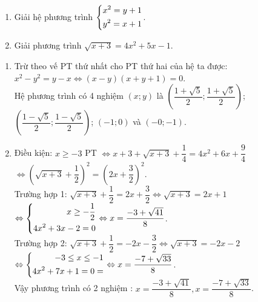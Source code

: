 \begin{ex}%
    \begin{enumerate}
        \item Giải hệ phương trình $\left\{\begin{aligned}x^2=y+1\\y^2=x+1\end{aligned}\right.$.\\
        \item Giải phương trình $\sqrt{x+3}=4x^2+5x-1$.
    \end{enumerate}
\loigiai
    {
    \begin{enumerate}
        \item Trừ theo vế PT thứ nhất cho PT thứ hai của hệ ta được:\\
 $x^2-y^2=y-x \Leftrightarrow \left( {x - y} \right)\left( {x + y + 1} \right) = 0$.\\
Hệ phương trình có 4 nghiệm $\left( {x;y} \right)$ là $\left( {\dfrac{{1 + \sqrt 5 }}{2};\dfrac{{1 + \sqrt 5 }}{2}} \right)$;\\
$\left( {\dfrac{{1 - \sqrt 5 }}{2};\dfrac{{1 - \sqrt 5 }}{2}} \right)$; $\left( {-1;0} \right)$ và $\left( {-0;-1} \right)$.
        \item Điều kiện: $x \ge -3$ PT $\Leftrightarrow x+3+\sqrt{x+3}+\dfrac{1}{4}=4x^2+6x+\dfrac{9}{4}$\\
$\Leftrightarrow {\left( {\sqrt {x + 3}  + \dfrac{1}{2}} \right)^2} = {\left( {2x + \dfrac{3}{2}} \right)^2}$.\\
Trường hợp 1: $\sqrt {x + 3}  + \dfrac{1}{2} = 2x + \dfrac{3}{2} \Leftrightarrow \sqrt {x + 3} =2x+1$\\
$\Leftrightarrow \left\{\begin{aligned}x \ge -\dfrac{1}{2}\\4x^2+3x-2=0\end{aligned}\right. \Leftrightarrow x=\dfrac{-3+\sqrt{41}}{8}$.\\
Trường hợp 2: $\sqrt {x + 3}  + \dfrac{1}{2} = -2x - \dfrac{3}{2} \Leftrightarrow \sqrt {x + 3} =-2x-2$\\
$\Leftrightarrow \left\{\begin{aligned} -3 \le x \le -1 \\4x^2+7x+1=0=\end{aligned}\right. \Leftrightarrow x=\dfrac{-7+\sqrt{33}}{8}$.\\
Vậy phương trình có 2 nghiệm : $x=\dfrac{-3+\sqrt{41}}{8}, x=\dfrac{-7+\sqrt{33}}{8}$.
    \end{enumerate}
    }
\end{ex}

